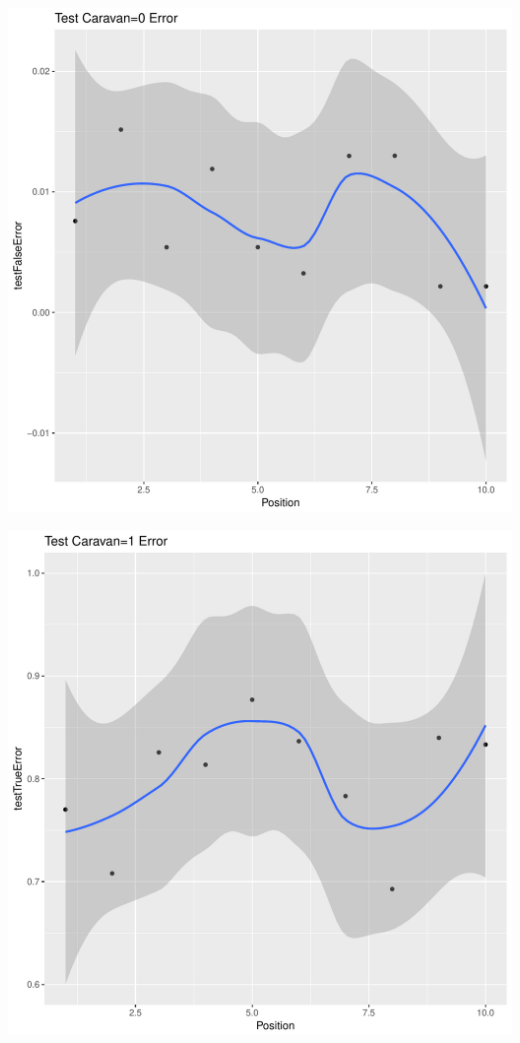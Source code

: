 \documentclass{article}\usepackage[]{graphicx}\usepackage[]{color}
\makeatletter
\def\maxwidth{ %
  \ifdim\Gin@nat@width>\linewidth
    \linewidth
  \else
    \Gin@nat@width
  \fi
}
\newenvironment{kframe}{%
 \def\at@end@of@kframe{}%
 \ifinner\ifhmode%
  \def\at@end@of@kframe{\end{minipage}}%
  \begin{minipage}{\columnwidth}%
 \fi\fi%
 \def\FrameCommand##1{\hskip\@totalleftmargin \hskip-\fboxsep
 \colorbox{shadecolor}{##1}\hskip-\fboxsep
     \hskip-\linewidth \hskip-\@totalleftmargin \hskip\columnwidth}%
 \MakeFramed {\advance\hsize-\width
   \@totalleftmargin\z@ \linewidth\hsize
   \@setminipage}}%
 {\par\unskip\endMakeFramed%
 \at@end@of@kframe}
\newenvironment{knitrout}{}{} %
\makeatother
\begin{document}
\begin{knitrout}
\begin{kframe}
{\ttfamily\noindent\itshape\color{messagecolor}{\#\# `geom\_smooth()` using method = 'loess'}}\end{kframe}
\includegraphics[width=\maxwidth]{figure/unnamed-chunk-39-6} 
\begin{kframe}

{\ttfamily\noindent\itshape\color{messagecolor}{\#\# `geom\_smooth()` using method = 'loess'}}\end{kframe}
\includegraphics[width=\maxwidth]{figure/unnamed-chunk-39-7} 
\begin{kframe}


\end{kframe}
\end{knitrout}
\end{document}
